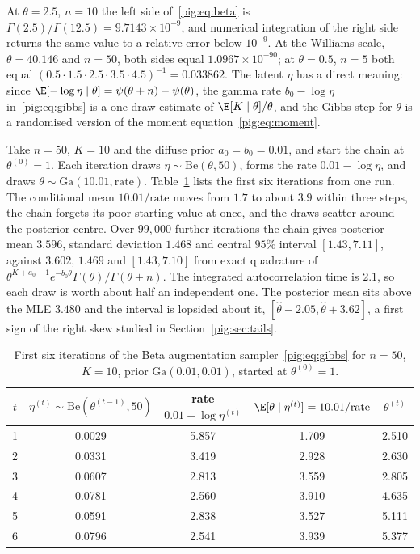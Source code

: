 \begin{example}\label{pig:ex:betaid}
At $\theta=2.5$, $n=10$ the left side of~\eqref{pig:eq:beta} is $\Gamma(2.5)/\Gamma(12.5)=9.7143\times10^{-9}$, and numerical integration of the right side returns the same value to a relative error below $10^{-9}$. At the Williams scale, $\theta=40.146$ and $n=50$, both sides equal $1.0967\times10^{-90}$; at $\theta=0.5$, $n=5$ both equal $(0.5\cdot1.5\cdot2.5\cdot3.5\cdot4.5)^{-1}=0.033862$. The latent $\eta$ has a direct meaning: since $\E[-\log\eta\mid\theta]=\psi(\theta+n)-\psi(\theta)$, the gamma rate $b_0-\log\eta$ in~\eqref{pig:eq:gibbs} is a one draw estimate of $\E[K\mid\theta]/\theta$, and the Gibbs step for $\theta$ is a randomised version of the moment equation~\eqref{pig:eq:moment}.
\end{example}

\begin{example}\label{pig:ex:gibbs}
Take $n=50$, $K=10$ and the diffuse prior $a_0=b_0=0.01$, and start the chain at $\theta^{(0)}=1$. Each iteration draws $\eta\sim\mathrm{Be}(\theta,50)$, forms the rate $0.01-\log\eta$, and draws $\theta\sim\mathrm{Ga}(10.01,\text{rate})$. Table~\ref{pig:tab:gibbs} lists the first six iterations from one run. The conditional mean $10.01/\text{rate}$ moves from $1.7$ to about $3.9$ within three steps, the chain forgets its poor starting value at once, and the draws scatter around the posterior centre. Over $99{,}000$ further iterations the chain gives posterior mean $3.596$, standard deviation $1.468$ and central $95\%$ interval $[1.43, 7.11]$, against $3.602$, $1.469$ and $[1.43, 7.10]$ from exact quadrature of $\theta^{K+a_0-1}e^{-b_0\theta}\Gamma(\theta)/\Gamma(\theta+n)$. The integrated autocorrelation time is $2.1$, so each draw is worth about half an independent one. The posterior mean sits above the MLE $3.480$ and the interval is lopsided about it, $[\hat\theta-2.05,\hat\theta+3.62]$, a first sign of the right skew studied in Section~\ref{pig:sec:tails}.
\end{example}

\begin{table}[t]
\centering
\caption{First six iterations of the Beta augmentation sampler~\eqref{pig:eq:gibbs} for $n=50$, $K=10$, prior $\mathrm{Ga}(0.01,0.01)$, started at $\theta^{(0)}=1$.}
\label{pig:tab:gibbs}
\small
\begin{tabular}{@{}ccccc@{}}
\toprule
$t$ & $\eta^{(t)}\sim\mathrm{Be}(\theta^{(t-1)},50)$ & rate $0.01-\log\eta^{(t)}$ & $\E[\theta\mid\eta^{(t)}]=10.01/\text{rate}$ & $\theta^{(t)}$\\
\midrule
1 & 0.0029 & 5.857 & 1.709 & 2.510\\
2 & 0.0331 & 3.419 & 2.928 & 2.630\\
3 & 0.0607 & 2.813 & 3.559 & 2.805\\
4 & 0.0781 & 2.560 & 3.910 & 4.635\\
5 & 0.0591 & 2.838 & 3.527 & 5.111\\
6 & 0.0796 & 2.541 & 3.939 & 5.377\\
\bottomrule
\end{tabular}
\end{table}

